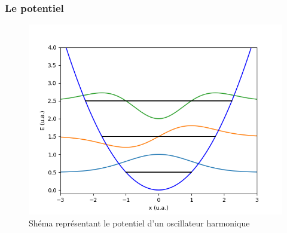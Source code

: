 \documentclass[aspectratio=169]{beamer}
\begin{document}
\begin{frame}
\frametitle{Le potentiel}
\begin{figure}
\includegraphics[scale=0.6]{fct_propre}
\caption{Shéma représentant le potentiel d'un oscillateur harmonique}
\end{figure}
\end{frame}
\end{document}
